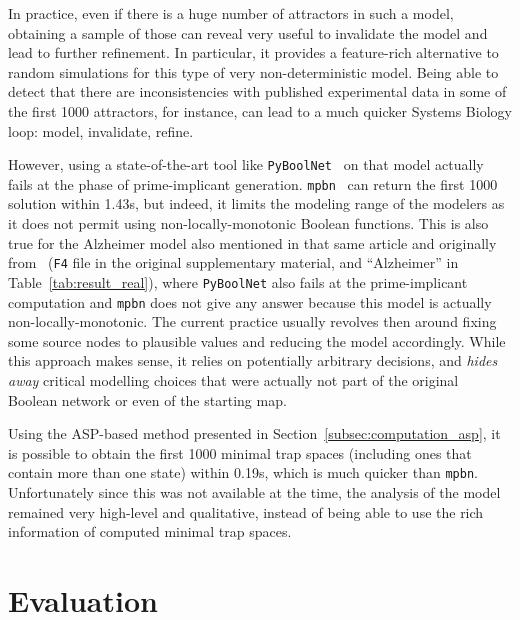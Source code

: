 \documentclass[preprint,12pt]{elsarticle}
\begin{document}
In practice, even if there is a huge number of attractors in such a model, obtaining a sample of those can reveal very useful to invalidate the model and lead to further refinement.
In particular, it provides a feature-rich alternative to random simulations for this type of very non-deterministic model.
Being able to detect that there are inconsistencies with published experimental data in some of the first 1000 attractors, for instance, can lead to a much quicker Systems Biology loop: model, invalidate, refine.

However, using a state-of-the-art tool like \texttt{PyBoolNet}~\cite{klarner2015computing} on that model actually fails at the phase of prime-implicant generation.
\texttt{mpbn}~\cite{Paulev2020} can return the first 1000 solution within 1.43s, but indeed, it limits the modeling range of the modelers as it does not permit using non-locally-monotonic Boolean functions.
This is also true for the Alzheimer model also mentioned in that same article and originally from~\cite{ogishima2016alzpathway} (\verb|F4| file in the original supplementary material, and ``Alzheimer'' in Table~\ref{tab:result_real}), where \texttt{PyBoolNet} also fails at the prime-implicant computation and \texttt{mpbn} does not give any answer because this model is actually non-locally-monotonic.
The current practice usually revolves then around fixing some source nodes to plausible values and reducing the model accordingly.
While this approach makes sense, it relies on potentially arbitrary decisions, and \emph{hides away} critical modelling choices that were actually not part of the original Boolean network or even of the starting map.

Using the ASP-based method presented in Section~\ref{subsec:computation_asp}, it is possible to obtain the first 1000 minimal trap spaces (including ones that contain more than one state) within 0.19s, which is much quicker than \texttt{mpbn}.
Unfortunately since this was not available at the time, the analysis of the model remained very high-level and qualitative, instead of being able to use the rich information of computed minimal trap spaces.

\section{Evaluation}%
\label{sec:eval}
\end{document}
